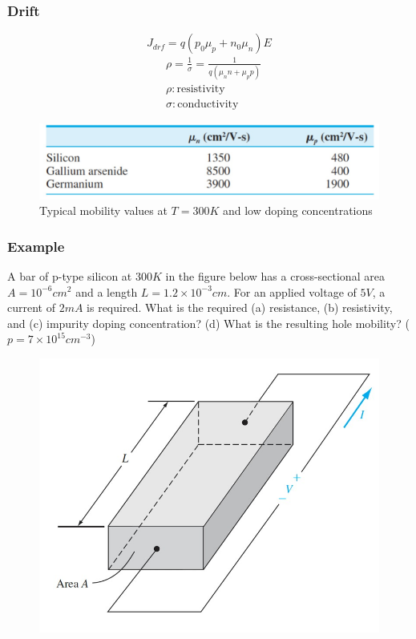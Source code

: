 \documentclass{beamer}
\begin{document}
    \begin{frame} \frametitle{Drift}
        \begin{equation*}
            \boxed{J_{drf} = q (p_0 \mu_p + n_0 \mu_n) E}
        \end{equation*}
        \begin{equation*}
            \begin{aligned}
                & \rho = \frac{1}{\sigma} = \frac{1}{q(\mu_n n + \mu_p p)} \\
                & \rho:  \text{resistivity} \\
                & \sigma:  \text{conductivity}
            \end{aligned}
        \end{equation*}
        \begin{figure}[H]
            \centering
            \includegraphics[width=0.9\linewidth]{Typical-mobility.jpg}
            \caption{Typical mobility values at $T = 300K$ and low doping concentrations}
            \label{fig:Typical-mobility.jpg}
        \end{figure}
    \end{frame}


    \begin{frame} \frametitle{Example}
        \par A bar of p-type silicon at $300K$ in the figure below has a cross-sectional area $A = 10^{-6} cm^2$ and a length $L = 1.2 \times 10^{-3} cm$. For an applied voltage of $5V$, a current of $2mA$ is required. What is the required (a) resistance, (b) resistivity, and (c) impurity doping concentration? (d) What is the resulting hole mobility? ($p = 7 \times 10^{15} cm^{-3}$)
        \begin{figure}[H]
            \begin{flushleft}
                \includegraphics[width=0.6\linewidth]{Example.jpg}
            \end{flushleft}
            \label{fig:Example.jpg}
        \end{figure}
        
    \end{frame}
\end{document}
